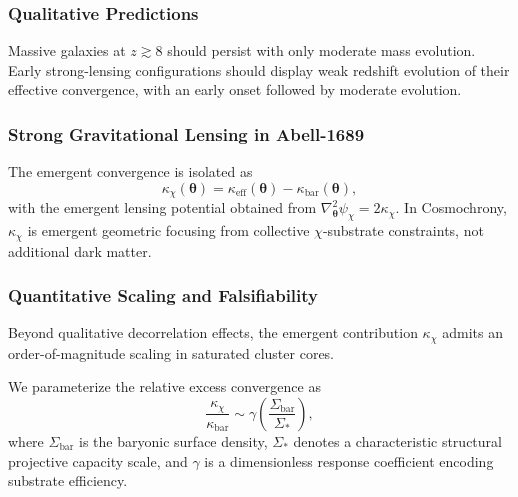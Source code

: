   \subsubsection*{Qualitative Predictions}
    \label{subsec:qualitative-prediction-early-galaxies}
    \label{subsec:qualitative-prediction-early-lensing}

    Massive galaxies at $z \gtrsim 8$ should persist with only moderate mass
    evolution.
    Early strong-lensing configurations should display weak redshift evolution
    of their effective convergence, with an early onset followed by moderate
    evolution.

  \subsubsection*{Strong Gravitational Lensing in Abell-1689}
    \label{subsec:a1689-strong-lensing}

    The emergent convergence is isolated as
    \begin{equation}
      \kappa_{\chi}(\boldsymbol{\theta})
      = \kappa_{\mathrm{eff}}(\boldsymbol{\theta})
      - \kappa_{\mathrm{bar}}(\boldsymbol{\theta}),
    \end{equation}
    with the emergent lensing potential obtained from
    $\nabla_{\boldsymbol{\theta}}^2 \psi_{\chi} =
    2\kappa_{\chi}$.
    In Cosmochrony, $\kappa_{\chi}$ is emergent geometric focusing from
    collective $\chi$-substrate constraints, not additional dark matter.

  \subsubsection*{Quantitative Scaling and Falsifiability}

    Beyond qualitative decorrelation effects, the emergent contribution
    $\kappa_{\chi}$ admits an order-of-magnitude scaling in saturated
    cluster cores.

    We parameterize the relative excess convergence as
    \begin{equation}
      \frac{\kappa_{\chi}}{\kappa_{\mathrm{bar}}}
      \sim \gamma
      \left(
        \frac{\Sigma_{\mathrm{bar}}}
        {\Sigma_*}
      \right),
    \end{equation}
    where $\Sigma_{\mathrm{bar}}$ is the baryonic surface density,
    $\Sigma_*$ denotes a characteristic structural projective capacity scale,
    and $\gamma$ is a dimensionless response coefficient encoding substrate efficiency.

